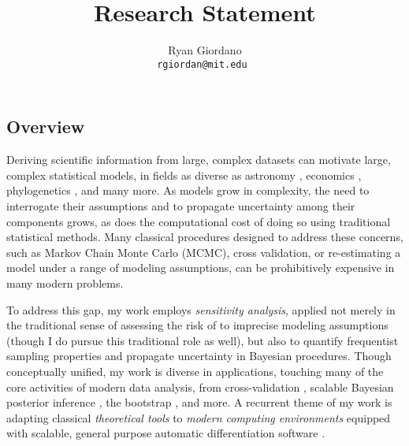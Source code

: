 

\title{Research Statement}

\author{
  Ryan Giordano \\ \texttt{rgiordan@mit.edu }
}




\subsection*{Overview}

Deriving scientific information from large, complex datasets can motivate large,
complex statistical models, in fields as diverse as astronomy
\citep{regier:2019:cataloging}, economics \citep{meager:2019:microcredit},
phylogenetics \citep{pritchard:2000:inference}, and many more.  As models grow
in complexity, the need to interrogate their assumptions and to propagate
uncertainty among their components grows, as does the computational
cost of doing so using traditional statistical methods. Many classical
procedures designed to address these concerns, such as Markov Chain Monte Carlo
(MCMC), cross validation, or re-estimating a model under a range of
modeling assumptions, can be prohibitively expensive in many modern problems.

To address this gap, my work employs {\em sensitivity analysis}, applied not
merely in the traditional sense of assessing the risk of to imprecise modeling
assumptions (though I do pursue this traditional role as well), but also to
quantify frequentist sampling properties and propagate uncertainty in Bayesian
procedures. Though conceptually unified, my work is diverse in applications,
touching many of the core activities of modern data analysis, from
cross-validation \citep{giordano:2019:ij, giordano2019:hoij}, scalable Bayesian
posterior inference \citep{giordano:2018:covariances,
giordano:2018:bnpsensitivity}, the bootstrap \citep{giordano:2020:bayesij}, and
more. A recurrent theme of my work is adapting classical {\em theoretical tools}
\citep{reeds:1976:thesis, gustafson:1996:localposterior} to {\em modern
computing environments} equipped with scalable, general purpose automatic
differentiation software \citep{baydin:2015:automatic, carpenter:2015:stanmath}.


